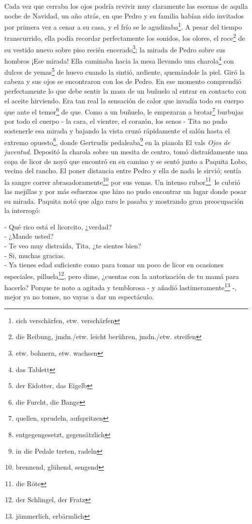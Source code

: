 Cada vez que cerraba los ojos podría revivir muy claramente las escenas
de aqulla noche de Navidad, un año atrás, en que Pedro y su familia
habían sido invitados por primera vez a cenar a su casa, y el frío se le agudizaba\footnote{sich verschärfen, etw. verschärfen}.
A pesar del tiempo transcurrido, ella podía recordar perfectamente los
sonidos, los olores, el roce\footnote{die Reibung, jmdn./etw. leicht berühren, jmdn./etw. streifen} de su vestido nuevo sobre
piso recién encerado\footnote{etw. bohnern, etw. wachsen}; la mirada de Pedro sobre sus hombros \ndots ¡Ese
mirada! Ella caminaba hacia la mesa llevando una charola\footnote{das Tablett} con dulces de yemas\footnote{der Eidotter, das Eigelb} de huevo cuando la sintió, ardiente, quemándole la piel. Giró la
cabeza y sus ojos se encontraron con los de Pedro. En ese momento
comprendió perfectamente lo que debe sentir la masa de un buñuelo al
entrar en contacto con el aceite hirviendo. Era tan real la sensación de
calor que invadía todo su cuerpo que ante el temor\footnote{die Furcht, die Bange} de que. Como a un
buñuelo, le empezaran a brotar\footnote{quellen, sprudeln, aufspritzen}
burbujas por todo el cuerpo - la cara, el
vientre, el corazón, los senos - Tita no pudo sostenerle esa mirada y
bajando la vista cruzó rápidamente el salón hasta el extremo opuesto\footnote{entgegengesetzt, gegensätzlich},
donde Gertrudis pedaleaba\footnote{in die Pedale treten, radeln} en la pianola El vals \textit{Ojos de juventud}.
Depositó la charola sobre un mesita de centro, tomó distraídamente una
copa de licor de noyó que encontró en su camino y se sentó junto a
Paquita Lobo, vecina del rancho. El poner distancia entre Pedro y ella
de nada le sirvió; sentía la sangre correr abrasadoramente\footnote{brennend, glühend, sengend} por sus
venas. Un intenso rubor\footnote{die Röte}~le cubrió las mejillas y por más esfuerzos
que hizo no pudo encontrar un lugar donde posar su mirada. Paquita notó
que algo raro le pasaba y mostrando gran preocupación la interrogó:

- Qué rico está el licorcito, ¿verdad? %
\\- ¿Mande usted? %
\\- Te veo muy distraída, Tita, ¿te sientes bien? %
\\- Si, muchas gracias. %
\\- Ya tienes edad suficiente como para tomar un poco de licor en %
ocasiones especiales, pilluela\footnote{der Schlingel, der Fratz}, pero dime, ¿cuentas con la autorización %
de tu mamá para hacerlo? Porque te noto a agitada y temblorosa - y %
añadió lastimeramente\footnote{jämmerlich, erbärmlich} -, mejor ya no tomes, no vayas a dar un %
espectáculo.\\


